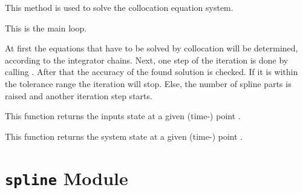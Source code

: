 \documentclass[letterpaper,10pt,english]{sphinxmanual}
\begin{document}
\begin{fulllineitems}
\begin{fulllineitems}
\label{pytrajectory:pytrajectory.trajectory.Trajectory.solve}
This method is used to solve the collocation equation system.

\end{fulllineitems}


\begin{fulllineitems}
\label{pytrajectory:pytrajectory.trajectory.Trajectory.startIteration}
This is the main loop.

At first the equations that have to be solved by collocation will be determined, according
to the integrator chains.
Next, one step of the iteration is done by calling {\hyperref[pytrajectory:pytrajectory.trajectory.Trajectory.iterate]{}}.
After that the accuracy of the found solution is checked.
If it is within the tolerance range the iteration will stop.
Else, the number of spline parts is raised and another iteration step starts.

\end{fulllineitems}


\begin{fulllineitems}
\label{pytrajectory:pytrajectory.trajectory.Trajectory.u}
This function returns the inputs state at a given (time-) point .

\end{fulllineitems}


\begin{fulllineitems}
\label{pytrajectory:pytrajectory.trajectory.Trajectory.x}
This function returns the system state at a given (time-) point .

\end{fulllineitems}


\end{fulllineitems}



\section{\texttt{spline} Module}
\label{pytrajectory:spline-module}\label{pytrajectory:module-pytrajectory.spline}
\end{document}
